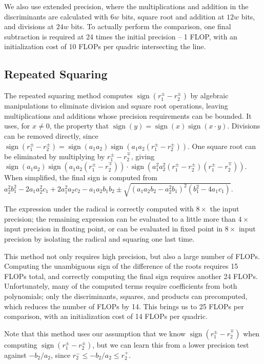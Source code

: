 \documentclass{cccg16}
\DeclareMathOperator{\sign}{sign}
\begin{document}
We also use extended precision, where the multiplications and addition
in the discriminants are calculated with $6w$ bits, square root and
addition at $12w$ bits, and divisions at $24w$ bits.  To actually
perform the comparison, one final subtraction is required at 24 times
the initial precision -- 1 FLOP, with an initialization cost of 10
FLOPs per quadric intersecting the line.

\subsection{Repeated Squaring}
The repeated squaring method computes $\sign(r_1^\pm-r_2^\pm)$ by
algebraic manipulations to eliminate division and square root
operations, leaving multiplications and additions whose precision
requirements can be bounded.  It uses, for $x\ne 0$, the property that
$\sign(y)=\sign(x)\sign(x\cdot y)$.  Divisions can be removed
directly, since $\sign(r_1^\pm-r_2^\pm)=\sign(a_1 a_2)\sign(a_1 a_2
(r_1^\pm-r_2^\pm))$.  One square root can be eliminated by multiplying
by $r_1^\pm-r_2^\mp$, giving~$\sign(a_1 a_2)\sign(a_1 a_2
(r_1^\pm-r_2^\mp))\cdot\sign(a_1^2 a_2^2 (r_1^\pm - r_2^\pm) (r_1^\pm
- r_2^\mp))$.  When simplified, the final sign is computed
from~$a_2^2b_1^2-2a_1a_2^2c_1+2a_1^2a_2c_2-a_1a_2b_1b_2\pm
\sqrt{(a_1a_2b_2-a_2^2b_1)^2(b_1^2-4a_1c_1)}$.

The expression under the radical is correctly computed with $8\times$
the input precision; the remaining expression can be evaluated to a
little more than $4\times$ input precision in floating point, or can
be evaluated in fixed point in $8\times$ input precision by isolating
the radical and squaring one last time.

This method not only requires high precision, but also a large number
of FLOPs.  Computing the unambiguous sign of the difference of the
roots requires 15 FLOPs total, and correctly computing the final sign
requires another 24 FLOPs.  Unfortunately, many of the computed terms
require coefficients from both polynomials; only the discriminants,
squares, and products can precomputed, which reduces the number of
FLOPs by 14.  This brings us to 25 FLOPs per comparison, with an
initialization cost of 14 FLOPs per quadric.

Note that this method uses our assumption that we know
$\sign(r_1^\pm-r_2^\mp)$ when computing $\sign(r_1^\pm-r_2^\pm)$, but
we can learn this from a lower precision test against $-b_2/a_2$,
since $r_2^- \le -b_2/a_2 \le r_2^+$.
\end{document}
